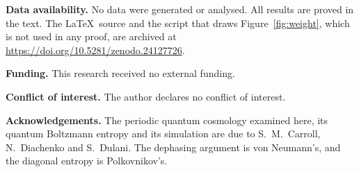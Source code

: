 \documentclass[11pt]{amsart}
\theoremstyle{definition}
\begin{document}
\noindent\textbf{Data availability.} No data were generated or analysed. All results are proved in the text. The \LaTeX\ source and the script that draws Figure~\ref{fig:weight}, which is not used in any proof, are archived at \url{https://doi.org/10.5281/zenodo.24127726}.

\smallskip\noindent\textbf{Funding.} This research received no external funding.

\smallskip\noindent\textbf{Conflict of interest.} The author declares no conflict of interest.

\smallskip\noindent\textbf{Acknowledgements.} The periodic quantum cosmology examined here, its quantum Boltzmann entropy and its simulation are due to S.~M.~Carroll, N.~Diachenko and S.~Dulani. The dephasing argument is von Neumann's, and the diagonal entropy is Polkovnikov's.
\end{document}
